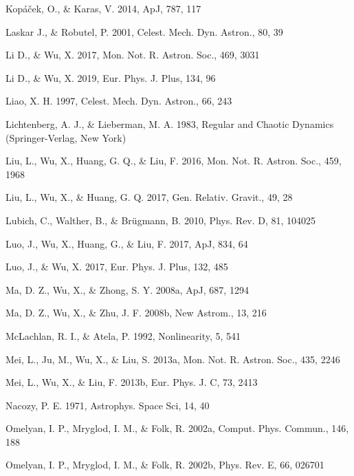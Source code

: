 \documentclass[preprint2]{aastex}
\begin{document}
\begin{thebibliography}{}
 Kop\'{a}\v{c}ek, O., \& Karas, V. 2014, ApJ, 787, 117

 Laskar J., \& Robutel, P. 2001, Celest. Mech. Dyn. Astron., 80, 39

 Li D., \& Wu, X. 2017, Mon. Not. R. Astron. Soc., 469, 3031

 Li D., \& Wu, X. 2019,  Eur. Phys. J. Plus, 134, 96

  Liao, X. H. 1997, Celest. Mech. Dyn. Astron., 66, 243

  Lichtenberg, A. J., \& Lieberman, M. A. 1983, Regular and
Chaotic Dynamics (Springer-Verlag, New York)

 Liu, L., Wu, X., Huang, G. Q., \& Liu, F. 2016, Mon. Not. R. Astron. Soc., 459, 1968

 Liu, L., Wu, X., \& Huang, G. Q. 2017, Gen. Relativ. Gravit., 49, 28

 Lubich, C., Walther, B., \& Br\"{u}gmann, B. 2010, Phys. Rev.
D, 81, 104025

 Luo, J., Wu, X., Huang, G., \& Liu, F. 2017, ApJ, 834, 64

 Luo, J., \& Wu, X. 2017, Eur. Phys. J. Plus, 132, 485

 Ma, D. Z., Wu, X., \& Zhong, S. Y. 2008a, ApJ, 687, 1294

 Ma, D. Z., Wu, X., \& Zhu, J. F. 2008b, New Astrom., 13, 216

  McLachlan, R. I., \&  Atela, P. 1992, Nonlinearity, 5, 541

 Mei, L., Ju, M., Wu, X., \& Liu, S. 2013a, Mon. Not. R. Astron. Soc., 435, 2246

 Mei, L., Wu, X., \& Liu, F. 2013b, Eur. Phys. J. C, 73, 2413

 Nacozy, P. E. 1971, Astrophys. Space Sci, 14, 40

  Omelyan, I. P.,  Mryglod, I. M., \&  Folk, R. 2002a, Comput. Phys.
Commun., 146, 188

  Omelyan, I. P.,  Mryglod, I. M., \&  Folk, R. 2002b, Phys. Rev. E, 66,
026701


\end{thebibliography}
\end{document}
